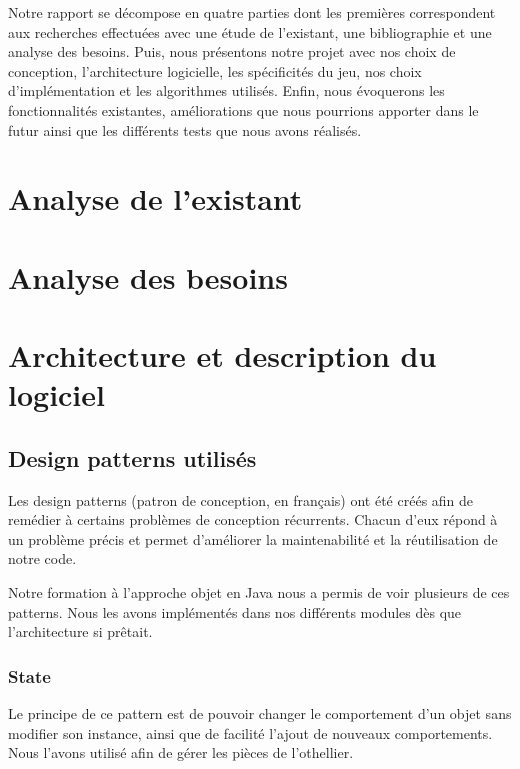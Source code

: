 \documentclass[a4paper,12pt]{report}
\begin{document}
Notre rapport se décompose en quatre parties dont les premières correspondent aux recherches effectuées avec une étude de l’existant, une bibliographie et une analyse des besoins. Puis, nous présentons notre projet avec nos choix de conception, l’architecture logicielle, les spécificités du jeu, nos choix d’implémentation et les algorithmes utilisés. Enfin, nous évoquerons les fonctionnalités existantes, améliorations que nous pourrions apporter dans le futur ainsi que les différents tests que nous avons réalisés.



\chapter{Analyse de l'existant}



\chapter{Analyse des besoins}



\chapter{Architecture et description du logiciel}



\section{Design patterns utilisés}

Les design patterns (patron de conception, en français) ont été créés afin de remédier à certains problèmes de conception récurrents. Chacun d’eux répond à un problème précis et permet d’améliorer la maintenabilité et la réutilisation de notre code. 

Notre formation à l’approche objet en Java nous a permis de voir plusieurs de ces patterns. Nous les avons implémentés dans nos différents modules dès que l’architecture si prêtait.

\subsection{State}

Le principe de ce pattern est de pouvoir changer le comportement d’un objet sans modifier son instance, ainsi que de facilité l’ajout de nouveaux comportements. Nous l’avons utilisé afin de gérer les pièces de l’othellier.
\end{document}
